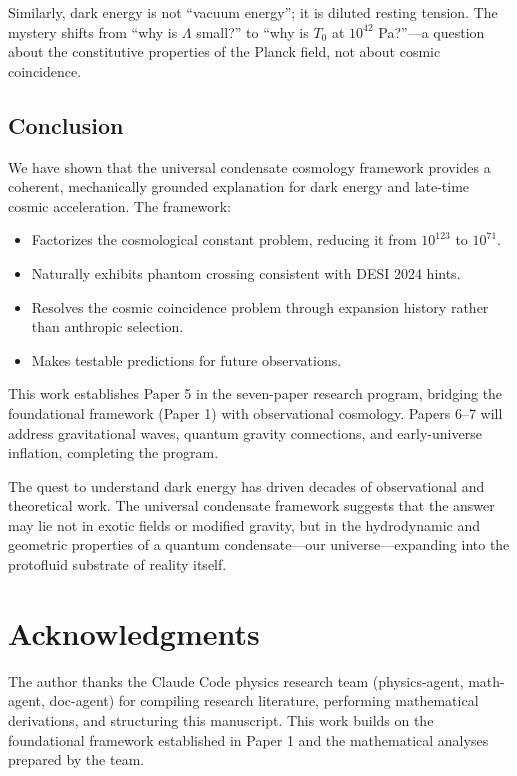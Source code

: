 \documentclass[11pt,a4paper]{article}
\newcommand{\Tzero}{\ensuremath{T_0}}
\theoremstyle{definition}
\theoremstyle{remark}
\begin{document}
Similarly, dark energy is not ``vacuum energy''; it is diluted resting tension. The mystery shifts from ``why is $\Lambda$ small?'' to ``why is $\Tzero$ at $10^{42}$ Pa?''---a question about the constitutive properties of the Planck field, not about cosmic coincidence.

\subsection{Conclusion}
\label{sec:final_conclusion}

We have shown that the universal condensate cosmology framework provides a coherent, mechanically grounded explanation for dark energy and late-time cosmic acceleration. The framework:
\begin{itemize}[leftmargin=*, itemsep=0.2em]
\item Factorizes the cosmological constant problem, reducing it from $10^{123}$ to $10^{71}$.
\item Naturally exhibits phantom crossing consistent with DESI 2024 hints.
\item Resolves the cosmic coincidence problem through expansion history rather than anthropic selection.
\item Makes testable predictions for future observations.
\end{itemize}

This work establishes Paper 5 in the seven-paper research program, bridging the foundational framework (Paper 1) with observational cosmology. Papers 6--7 will address gravitational waves, quantum gravity connections, and early-universe inflation, completing the program.

The quest to understand dark energy has driven decades of observational and theoretical work. The universal condensate framework suggests that the answer may lie not in exotic fields or modified gravity, but in the hydrodynamic and geometric properties of a quantum condensate---our universe---expanding into the protofluid substrate of reality itself.

\section*{Acknowledgments}

The author thanks the Claude Code physics research team (physics-agent, math-agent, doc-agent) for compiling research literature, performing mathematical derivations, and structuring this manuscript. This work builds on the foundational framework established in Paper 1 and the mathematical analyses prepared by the team.
\end{document}

